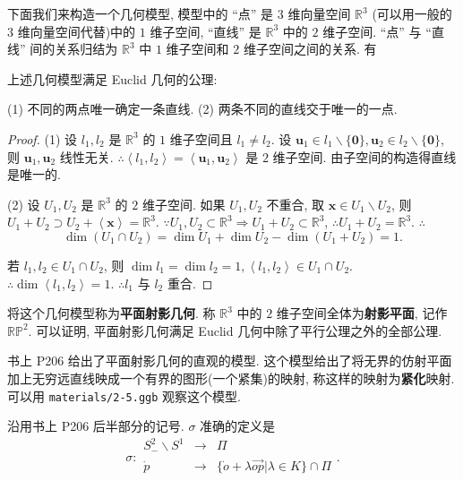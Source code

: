\documentclass[color=black,device=normal,lang=cn,mode=geye]{elegantnote}
\begin{document}
下面我们来构造一个几何模型, 模型中的 ``点'' 是 $3$ 维向量空间 $\mathbb{R}^3$ (可以用一般的 $3$ 维向量空间代替)中的 $1$ 维子空间, ``直线'' 是 $\mathbb{R}^3$ 中的 $2$ 维子空间. ``点'' 与 ``直线'' 间的关系归结为 $\mathbb{R}^3$ 中 $1$ 维子空间和 $2$ 维子空间之间的关系. 有
\begin{theorem}
    上述几何模型满足 Euclid 几何的公理:

    (1) 不同的两点唯一确定一条直线. (2) 两条不同的直线交于唯一的一点.
\end{theorem}
\begin{proof}
    (1) 设 $l_1,l_2$ 是 $\mathbb{R}^3$ 的 $1$ 维子空间且 $l_1\neq l_2$. 设 $\boldsymbol{u}_1\in l_1\backslash\{\boldsymbol{0}\},\boldsymbol{u}_2\in l_2\backslash\{\boldsymbol{0}\}$, 则 $\boldsymbol{u}_1,\boldsymbol{u}_2$ 线性无关. $\therefore\left<l_1,l_2\right>=\left<\boldsymbol{u}_1,\boldsymbol{u}_2\right>$ 是 $2$ 维子空间. 由子空间的构造得直线是唯一的.

    (2) 设 $U_1,U_2$ 是 $\mathbb{R}^3$ 的 $2$ 维子空间. 如果 $U_1,U_2$ 不重合, 取 $\boldsymbol{x}\in U_1\backslash U_2$, 则 $U_1+U_2\supset U_2+\left<\boldsymbol{x}\right>=\mathbb{R}^3$. $\because U_1,U_2\subset\mathbb{R}^3\Rightarrow U_1+U_2\subset\mathbb{R}^3$, $\therefore U_1+U_2=\mathbb{R}^3$. $\therefore$
    \[\dim(U_1\cap U_2)=\dim U_1+\dim U_2-\dim(U_1+U_2)=1.\]

    若 $l_1,l_2\in U_1\cap U_2$, 则 $\dim l_1=\dim l_2=1,\left<l_1,l_2\right>\in U_1\cap U_2$. $\therefore\dim\left<l_1,l_2\right>=1$. $\therefore l_1$ 与 $l_2$ 重合.
\end{proof}
将这个几何模型称为\textbf{平面射影几何}. 称 $\mathbb{R}^3$ 中的 $2$ 维子空间全体为\textbf{射影平面}, 记作 $\mathbb{RP}^2$. 可以证明, 平面射影几何满足 Euclid 几何中除了平行公理之外的全部公理.

书上 P206 给出了平面射影几何的直观的模型. 这个模型给出了将无界的仿射平面加上无穷远直线映成一个有界的图形(一个紧集)的映射, 称这样的映射为\textbf{紧化}映射. 可以用 \verb|materials/2-5.ggb| 观察这个模型.

沿用书上 P206 后半部分的记号. $\sigma$ 准确的定义是
\[\sigma:\begin{array}{rcl}
    S^2_-\backslash S^1 & \to & \varPi \\
    \dot{p} & \to & \{\dot{o}+\lambda\overrightarrow{op}|\lambda\in K\}\cap\varPi \\
\end{array}.\]
\end{document}
